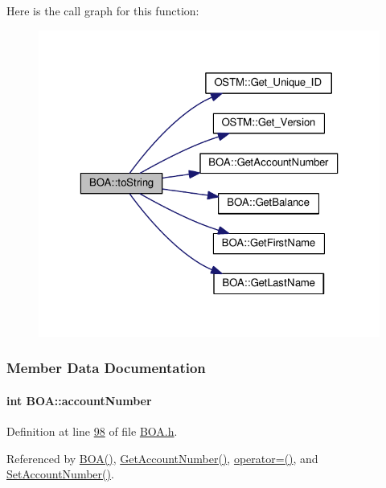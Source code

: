 Here is the call graph for this function\+:\nopagebreak
\begin{figure}[H]
\begin{center}
\leavevmode
\includegraphics[width=323pt]{class_b_o_a_a348df0299997f81bcad0ec034dab0b8d_a348df0299997f81bcad0ec034dab0b8d_cgraph}
\end{center}
\end{figure}




\subsubsection{Member Data Documentation}
\paragraph[{\texorpdfstring{account\+Number}{accountNumber}}]{\setlength{\rightskip}{0pt plus 5cm}int B\+O\+A\+::account\+Number\hspace{0.3cm}{\ttfamily [private]}}\hypertarget{class_b_o_a_a86ca4ad716db205f04c337b39b34d9ba_a86ca4ad716db205f04c337b39b34d9ba}{}\label{class_b_o_a_a86ca4ad716db205f04c337b39b34d9ba_a86ca4ad716db205f04c337b39b34d9ba}


Definition at line \hyperlink{_b_o_a_8h_source_l00098}{98} of file \hyperlink{_b_o_a_8h_source}{B\+O\+A.\+h}.



Referenced by \hyperlink{_b_o_a_8h_source_l00024}{B\+O\+A()}, \hyperlink{_b_o_a_8cpp_source_l00080}{Get\+Account\+Number()}, \hyperlink{_b_o_a_8h_source_l00064}{operator=()}, and \hyperlink{_b_o_a_8cpp_source_l00076}{Set\+Account\+Number()}.

